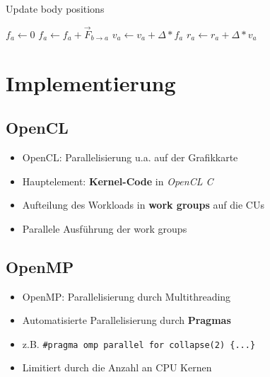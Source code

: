 \documentclass{beamer}
\begin{document}
\begin{frame}


\begin{algorithm}[H]
\caption{Update body positions}
\begin{algorithmic}[1]
      \State $f_a \gets 0$ 
        \State $f_a \gets f_a + \vec{F}^{\,}_{b\rightarrow a}$ 
      \EndFor
   \EndFor
      \State $v_a \gets v_a + \Delta * f_a$ 
      \State $r_a \gets r_a + \Delta * v_a$ 
   \EndFor
\EndProcedure
\end{algorithmic}
\end{algorithm}


\end{frame}

\section{Implementierung}

\subsection{OpenCL}
\begin{frame}
\begin{itemize}
  \item OpenCL: Parallelisierung u.a. auf der Grafikkarte
  \item Hauptelement: \textbf{Kernel-Code} in \textit{OpenCL C} 
  \item Aufteilung des Workloads in \textbf{work groups} auf die CUs
  \item Parallele Ausführung der work groups
\end{itemize}
\end{frame}

\subsection{OpenMP}
\begin{frame}
\begin{itemize}
  \item OpenMP: Parallelisierung durch Multithreading
  \item Automatisierte Parallelisierung durch \textbf{Pragmas}
  \item z.B. \texttt{\#pragma omp parallel for collapse(2) \{...\}}
  \item Limitiert durch die Anzahl an CPU Kernen
\end{itemize}
\end{frame}
\end{document}
